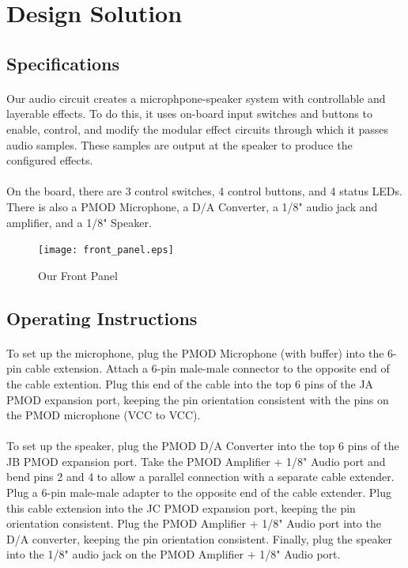 \documentclass[12pt]{article}
\begin{document}
\section{Design Solution}

\subsection{Specifications}
\paragraph{}
Our audio circuit creates a microphpone-speaker system with controllable and layerable effects. To do this, it uses on-board input switches and buttons to enable, control, and modify the modular effect circuits through which it passes audio samples. These samples are output at the speaker to produce the configured effects.
\paragraph{}
On the board, there are 3 control switches, 4 control buttons, and 4 status LEDs. There is also a PMOD Microphone, a D/A Converter, a 1/8" audio jack and amplifier, and a 1/8" Speaker. 
\begin{figure}
\texttt{[image: front\_panel.eps]}
\caption{Our Front Panel}
\end{figure}



\subsection{Operating Instructions}
\paragraph{}
To set up the microphone, plug the PMOD Microphone (with buffer) into the 6-pin cable extension. Attach a 6-pin male-male connector to the opposite end of the cable extention. Plug this end of the cable into the top 6 pins of the JA PMOD expansion port, keeping the pin orientation consistent with the pins on the PMOD microphone (VCC to VCC).



\paragraph{}
To set up the speaker, plug the PMOD D/A Converter into the top 6 pins of the JB PMOD expansion port. Take the PMOD Amplifier + 1/8" Audio port and bend pins 2 and 4 to allow a parallel connection with a separate cable extender. Plug a 6-pin male-male adapter to the opposite end of the cable extender. Plug this cable extension into the JC PMOD expansion port, keeping the pin orientation consistent. Plug the PMOD Amplifier + 1/8" Audio port into the D/A converter, keeping the pin orientation consistent. Finally, plug the speaker into the 1/8" audio jack on the PMOD Amplifier + 1/8" Audio port. 
\end{document}

